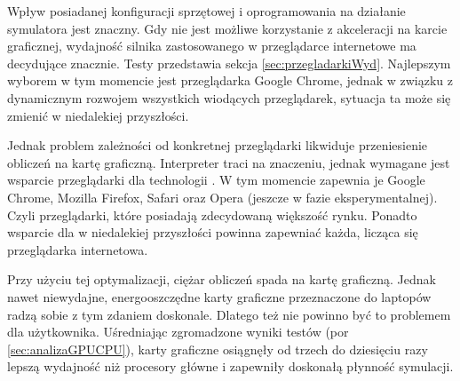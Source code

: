 Wpływ posiadanej konfiguracji sprzętowej i oprogramowania na działanie
symulatora jest znaczny. Gdy nie jest możliwe korzystanie z akceleracji na
karcie graficznej, wydajność silnika  zastosowanego w
przeglądarce internetowe ma decydujące znacznie. Testy przedstawia sekcja
\ref{sec:przegladarkiWyd}. Najlepszym wyborem w tym momencie jest przeglądarka
Google Chrome, jednak w związku z dynamicznym rozwojem wszystkich wiodących
przeglądarek, sytuacja ta może się zmienić w niedalekiej przyszłości.

Jednak problem zależności od konkretnej przeglądarki likwiduje przeniesienie
obliczeń na kartę graficzną. Interpreter  traci na znaczeniu,
jednak wymagane jest wsparcie przeglądarki dla technologii . W tym
momencie zapewnia je Google Chrome, Mozilla Firefox, Safari oraz Opera (jeszcze
w fazie eksperymentalnej). Czyli przeglądarki, które posiadają zdecydowaną
większość rynku. Ponadto wsparcie dla  w niedalekiej przyszłości
powinna zapewniać każda, licząca się przeglądarka internetowa.

Przy użyciu tej optymalizacji, ciężar obliczeń spada na kartę graficzną. Jednak
nawet niewydajne, energooszczędne karty graficzne przeznaczone do laptopów radzą
sobie z tym zdaniem doskonale. Dlatego też nie powinno być to problemem dla
użytkownika. Uśredniając zgromadzone wyniki testów (por
\ref{sec:analizaGPUCPU}), karty graficzne osiągnęły od trzech do dziesięciu razy
lepszą wydajność niż procesory główne i zapewniły doskonałą płynność symulacji.

